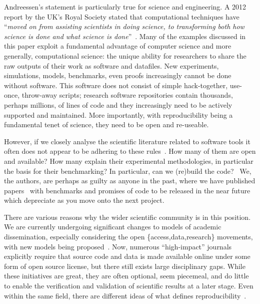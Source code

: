 \documentclass[a4paper,11pt]{article}
\begin{document}
Andreessen's statement is particularly true for science and
engineering. A 2012 report by the UK's Royal Society stated that
computational techniques have ``{\emph{moved on from assisting
scientists in doing science, to transforming both how science is done
and what science is done}}''~\cite{rssaaoe:2012}. Many of the examples
discussed in this paper exploit a fundamental advantage of computer
science and more generally, computational science: the unique ability
for researchers to share the raw outputs of their work as software and
datafiles. New experiments, simulations, models, benchmarks, even
proofs increasingly cannot be done without software. This software
does not consist of simple hack-together, use-once, throw-away
scripts; research software repositories contain thousands, perhaps
millions, of lines of code and they increasingly need to be actively
supported and maintained. More importantly, with reproducibility being
a fundamental tenet of science, they need to be open and re-useable.

However, if we closely analyse the scientific literature related to
software tools it often does not appear to be adhering to these
rules~\cite{nature:2011,alberts-et-al:2015}. How many of them are open
and available? How many explain their experimental methodologies, in
particular the basis for their benchmarking? In particular, can we
(re)build the code?~\cite{collberg+proebstring:2016} We, the authors, are
perhaps as guilty as anyone in the past, where we have published
papers~\cite{crick-et-al:2009a,Berdine2011SLAyer} with benchmarks and
promises of code to be released in the near future which depreciate as
you move onto the next project.

There are various reasons why the wider scientific community is in
this position. We are currently undergoing significant changes to
models of academic dissemination, especially considering the open
\{access,data,research\} movements, with new models being
proposed~\cite{deroure:2010,stodden-et-al:2013,fursin+dubach:2014}. Now,
numerous ``high-impact'' journals explicitly require that source code
and data is made available online under some form of open source
license, but there still exists large disciplinary gaps. While these
initiatives are great, they are often optional, seem piecemeal, and do
little to enable the verification and validation of scientific results
at a later stage. Even within the same field, there are different
ideas of what defines reproducibility~\cite{nasem:2016}.
\end{document}
